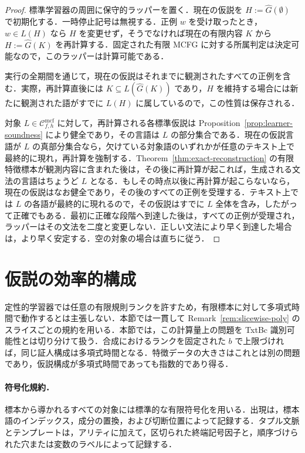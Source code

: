 \documentclass[11pt,a4paper]{ltjsarticle}
\numberwithin{equation}{section}
\theoremstyle{plain}
\theoremstyle{definition}
\theoremstyle{remark}
\newcommand{\Cmcf}[2]{\mathcal{C}^{\mathrm{mcf}}_{#1,#2}}
\begin{document}
\begin{proof}
標準学習器の周囲に保守的ラッパーを置く．現在の仮説を \(H:=\widehat G(\emptyset)\) で初期化する．一時停止記号は無視する．正例 \(w\) を受け取ったとき，\(w\in L(H)\) なら \(H\) を変更せず，そうでなければ現在の有限内容 \(K\) から \(H:=\widehat G(K)\) を再計算する．固定された有限 MCFG に対する所属判定は決定可能なので，このラッパーは計算可能である．

実行の全期間を通じて，現在の仮説はそれまでに観測されたすべての正例を含む．実際，再計算直後には \(K\subseteq L(\widehat G(K))\) であり，\(H\) を維持する場合には新たに観測された語がすでに \(L(H)\) に属しているので，この性質は保存される．

対象 \(L\in\Cmcf{f}{h}\) に対して，再計算される各標準仮説は Proposition~\ref{prop:learner-soundness} により健全であり，その言語は \(L\) の部分集合である．現在の仮説言語が \(L\) の真部分集合なら，欠けている対象語のいずれかが任意のテキスト上で最終的に現れ，再計算を強制する．Theorem~\ref{thm:exact-reconstruction} の有限特徴標本が観測内容に含まれた後は，その後に再計算が起これば，生成される文法の言語はちょうど \(L\) となる．もしその時点以後に再計算が起こらないなら，現在の仮説はなお健全であり，その後のすべての正例を受理する．テキスト上では \(L\) の各語が最終的に現れるので，その仮説はすでに \(L\) 全体を含み，したがって正確でもある．最初に正確な段階へ到達した後は，すべての正例が受理され，ラッパーはその文法を二度と変更しない．正しい文法により早く到達した場合は，より早く安定する．空の対象の場合は直ちに従う．
\end{proof}

\section{仮説の効率的構成}
\label{sec:poly-time}

定性的学習器では任意の有限規則ランクを許すため，有限標本に対して多項式時間で動作するとは主張しない．本節では一貫して Remark~\ref{rem:slicewise-poly} のスライスごとの規約を用いる．本節では，この計算量上の問題を TxtBc 識別可能性とは切り分けて扱う．合成におけるランクを固定された \(b\) で上限づければ，同じ証人構成は多項式時間となる．特徴データの大きさはこれとは別の問題であり，仮説構成が多項式時間であっても指数的であり得る．

\paragraph{符号化規約．}
標本から導かれるすべての対象には標準的な有限符号化を用いる．出現は，標本語のインデックス，成分の置換，および切断位置によって記録する．タプル文脈とテンプレートは，アリティに加えて，区切られた終端記号因子と，順序づけられた穴または変数のラベルによって記録する．
\end{document}
